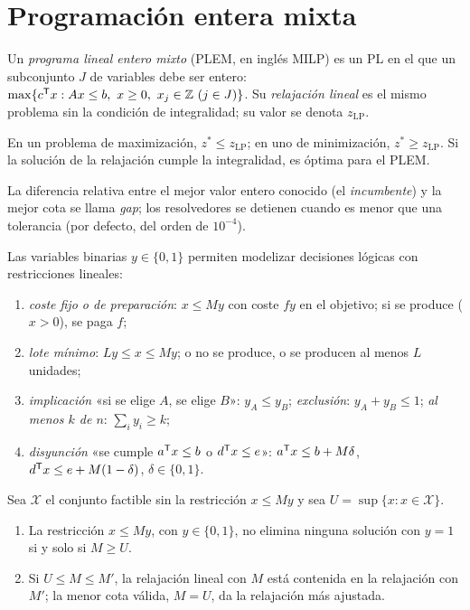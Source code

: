 \addtocounter{definicion}{1}%

\section{Programación entera mixta}

\begin{definicion}\label{def:plem}
Un \emph{programa lineal entero mixto} (PLEM, en inglés MILP) es un PL en el que un subconjunto $J$ de variables debe ser entero: $\max\{c^{\mathsf{T}} x: Ax\le b,\ x\ge 0,\ x_j\in\mathbb{Z}\ (j\in J)\}$. Su \emph{relajación lineal} es el mismo problema sin la condición de integralidad; su valor se denota $z_{\mathrm{LP}}$.
\end{definicion}

\begin{proposicion}\label{prop:relajacion}
En un problema de maximización, $z^{*}\le z_{\mathrm{LP}}$; en uno de minimización, $z^{*}\ge z_{\mathrm{LP}}$. Si la solución de la relajación cumple la integralidad, es óptima para el PLEM.
\end{proposicion}

La diferencia relativa entre el mejor valor entero conocido (el \emph{incumbente}) y la mejor cota se llama \emph{gap}; los resolvedores se detienen cuando es menor que una tolerancia (por defecto, del orden de $10^{-4}$).

Las variables binarias $y\in\{0,1\}$ permiten modelizar decisiones lógicas con restricciones lineales:
\begin{enumerate}[label=(\alph*)]
  \item \emph{coste fijo o de preparación}: $x\le My$ con coste $fy$ en el objetivo; si se produce ($x>0$), se paga $f$;
  \item \emph{lote mínimo}: $Ly\le x\le My$; o no se produce, o se producen al menos $L$ unidades;
  \item \emph{implicación} «si se elige $A$, se elige $B$»: $y_A\le y_B$; \emph{exclusión}: $y_A+y_B\le 1$; \emph{al menos $k$ de $n$}: $\sum_i y_i\ge k$;
  \item \emph{disyunción} «se cumple $a^{\mathsf{T}} x\le b$ o $d^{\mathsf{T}} x\le e$»: $a^{\mathsf{T}} x\le b+M\delta$, $d^{\mathsf{T}} x\le e+M(1-\delta)$, $\delta\in\{0,1\}$.
\end{enumerate}

\begin{proposicion}\label{prop:bigm}
Sea $\mathcal{X}$ el conjunto factible sin la restricción $x\le My$ y sea $U=\sup\{x: x\in\mathcal{X}\}$.
\begin{enumerate}
  \item La restricción $x\le My$, con $y\in\{0,1\}$, no elimina ninguna solución con $y=1$ si y solo si $M\ge U$.
  \item Si $U\le M\le M'$, la relajación lineal con $M$ está contenida en la relajación con $M'$; la menor cota válida, $M=U$, da la relajación más ajustada.
\end{enumerate}
\end{proposicion}

